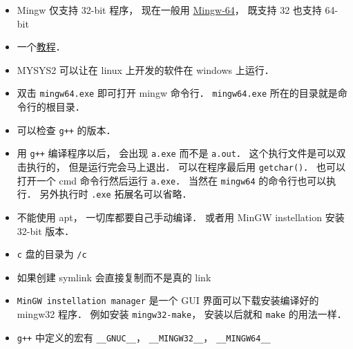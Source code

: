 
\begin{itemize}
\item Mingw 仅支持 32-bit 程序， 现在一般用 \href{https://en.wikipedia.org/wiki/Mingw-w64}{Mingw-64}， 既支持 32 也支持 64-bit
\item 一个\href{https://www3.ntu.edu.sg/home/ehchua/programming/howto/Cygwin_HowTo.html}{教程}．
\item MYSYS2 可以让在 linux 上开发的软件在 windows 上运行．
\item 双击 \verb|mingw64.exe| 即可打开 mingw 命令行． \verb|mingw64.exe| 所在的目录就是命令行的根目录．
\item 可以检查 \verb|g++| 的版本．
\item 用 \verb|g++| 编译程序以后， 会出现 \verb|a.exe| 而不是 \verb|a.out|． 这个执行文件是可以双击执行的， 但是运行完会马上退出． 可以在程序最后用 \verb|getchar()|． 也可以打开一个 cmd 命令行然后运行 \verb|a.exe|． 当然在 \verb|mingw64| 的命令行也可以执行． 另外执行时 \verb|.exe| 拓展名可以省略．
\item 不能使用 apt， 一切库都要自己手动编译． 或者用 MinGW instellation 安装 32-bit 版本．
\item \verb|c| 盘的目录为 \verb|/c|
\item 如果创建 symlink 会直接复制而不是真的 link
\item \verb|MinGW instellation manager| 是一个 GUI 界面可以下载安装编译好的 mingw32 程序． 例如安装 \verb|mingw32-make|， 安装以后就和 \verb|make| 的用法一样．
\item \verb|g++| 中定义的宏有 \verb|__GNUC__|， \verb|__MINGW32__|， \verb|__MINGW64__|
\end{itemize}

